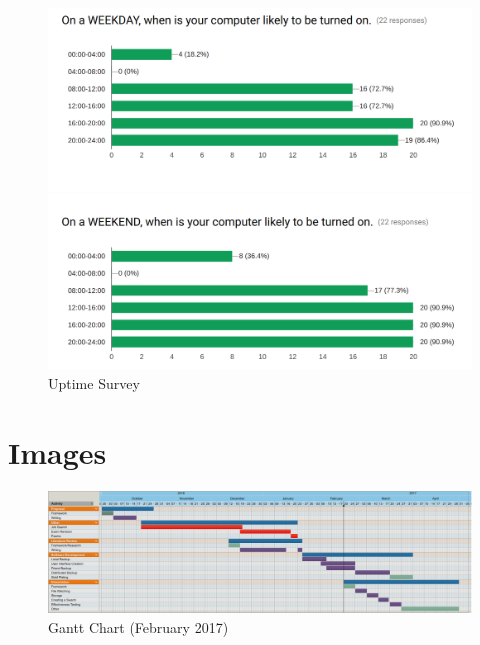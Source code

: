 \documentclass[11pt, a4paper, twoside]{report}
\begin{document}
\setlist{}

\begin{figure}[ht!]
 \centering
 \includegraphics[width=\textwidth]{uptime-survey}
 \caption{Uptime Survey}
 \label{fig:uptime-survey}
\end{figure}

\pagebreak

\section{Images}

\begin{figure}[!htb]
 \centering
 \includegraphics[width=\textwidth]{gantt}
 \caption{Gantt Chart (February 2017)}
 \label{fig:gantt}
\end{figure}
\end{document}
